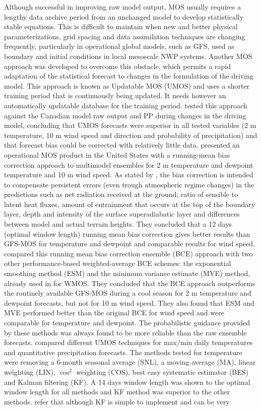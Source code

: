 Although successful in improving raw model output, MOS usually requires a lengthy data archive period from an unchanged model to develop statistically stable equations. This is difficult to maintain when new and better physical parameterizations, grid spacing and data assimilation techniques are changing frequently, particularly in operational global models, such as GFS, used as boundary and initial conditions in local mesoscale NWP systems. Another MOS approach was developed to overcome this obstacle, which permits a rapid adaptation of the statistical forecast to changes in the formulation of the driving model. This approach is known as Updatable MOS (UMOS) and uses a shorter training period that is continuously being updated. It needs however an automatically updatable database for the training period. \cite{WilsonVallee2002, WilsonVallee2003} tested this approach against the Canadian model raw output and PP during changes in the driving model, concluding that UMOS forecasts were superior in all tested variables (2 m temperature, 10 m wind speed and direction and probability of precipitation) and that forecast bias could be corrected with relatively little data. \cite{StensrudYussouf2003, StensrudYussouf2005} presented an operational MOS product in the United States with a running-mean bias correction approach to multimodel ensembles for 2 m temperature and dewpoint temperature and 10 m wind speed. As stated by \cite{StensrudYussouf2005}, the bias correction is intended to compensate persistent errors (even trough atmospheric regime changes) in the predictions such as net radiation received at the ground, ratio of sensible to  latent heat fluxes, amount of entrainment that occurs at the top of the boundary layer, depth and intensity of the surface superadiabatic layer and differences between model and actual terrain heights. They concluded that a 12 days (optimal window length) running mean bias correction gives better results than GFS-MOS for temperature and dewpoint and comparable results for wind speed. \cite{YussoufStensrud2007} compared this running mean bias correction ensemble (BCE) approach with two other performance-based weighted-average BCE schemes: the exponential smoothing method (ESM) and the minimum variance estimate (MVE) method, already used in \cite{BaarsMass2005} for WMOS. They concluded that the BCE approach outperforms the routinely available GFS-MOS during a cool season for 2 m temperature and dewpoint forecasts, but not for 10 m wind speed. They also found that ESM and MVE performed better than the original BCE for wind speed and were comparable for temperature and dewpoint. The probabilistic guidance provided by these methods was always found to be more reliable than the raw ensemble forecasts. \cite{Stull2008} compared different UMOS techniques for max/min daily temperatures and quantitative precipitation forecasts. The methods tested for temperature were removing a 6-month seasonal average (SNL), a moving average (MA), linear weighting (LIN), $\cos^2$ weighting (COS), best easy systematic estimator (BES) and Kalman filtering (KF). A 14 days window length was shown to the optimal window length for all methods and KF method was superior to the other methods. \cite{WilsonVallee2002} refer that although KF is simple to implement and can be very 